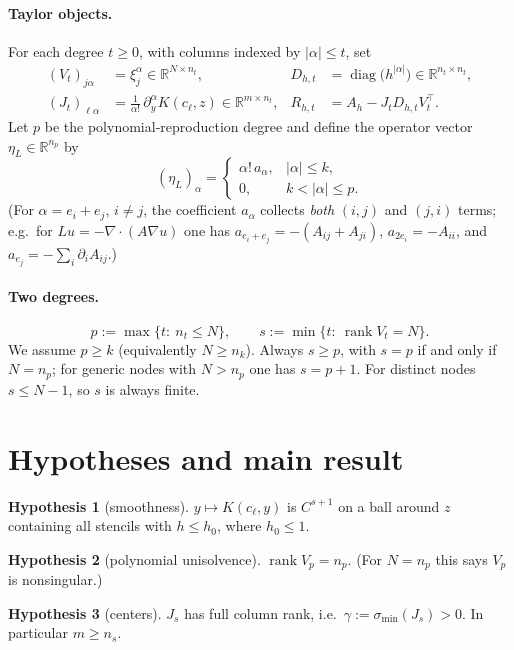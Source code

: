\documentclass[11pt]{article}
\newcommand{\R}{\mathbb{R}}
\newcommand{\smin}{\sigma_{\min}}
\newcommand{\rank}{\operatorname{rank}}
\newcommand{\diag}{\operatorname{diag}}
\theoremstyle{plain}
\theoremstyle{definition}
\newtheorem{hyp}{Hypothesis}
\theoremstyle{remark}
\begin{document}
\paragraph{Taylor objects.}
For each degree $t\ge0$, with columns indexed by $|\alpha|\le t$, set
\begin{align*}
(V_t)_{j\alpha}&=\xi_j^\alpha\in\R^{N\times n_t}, &
D_{h,t}&=\diag\big(h^{|\alpha|}\big)\in\R^{n_t\times n_t},\\
(J_t)_{\ell\alpha}&=\tfrac{1}{\alpha!}\,\partial_y^\alpha K(c_\ell,z)\in\R^{m\times n_t}, &
R_{h,t}&=A_h-J_tD_{h,t}V_t^{\top}.
\end{align*}
Let $p$ be the polynomial-reproduction degree and define the operator vector $\eta_L\in\R^{n_p}$ by
\[
(\eta_L)_\alpha=\begin{cases}\alpha!\,a_\alpha, & |\alpha|\le k,\\ 0,& k<|\alpha|\le p.\end{cases}
\]
(For $\alpha=e_i+e_j$, $i\ne j$, the coefficient $a_\alpha$ collects \emph{both} $(i,j)$ and $(j,i)$ terms; e.g.\ for $Lu=-\nabla\!\cdot(A\nabla u)$ one has $a_{e_i+e_j}=-(A_{ij}+A_{ji})$, $a_{2e_i}=-A_{ii}$, and $a_{e_j}=-\sum_i\partial_iA_{ij}$.)

\paragraph{Two degrees.}
\[
p:=\max\{t:\ n_t\le N\},\qquad s:=\min\{t:\ \rank V_t=N\}.
\]
We assume $p\ge k$ (equivalently $N\ge n_k$).
Always $s\ge p$, with $s=p$ if and only if $N=n_p$; for generic nodes with $N>n_p$ one has $s=p+1$.
For distinct nodes $s\le N-1$, so $s$ is always finite.

\section{Hypotheses and main result}

\begin{hyp}[smoothness]\label{h:smooth}
$y\mapsto K(c_\ell,y)$ is $C^{s+1}$ on a ball around $z$ containing all stencils with $h\le h_0$, where $h_0\le 1$.
\end{hyp}
\begin{hyp}[polynomial unisolvence]\label{h:poly}
$\rank V_p=n_p$.  (For $N=n_p$ this says $V_p$ is nonsingular.)
\end{hyp}
\begin{hyp}[centers]\label{h:centers}
$J_s$ has full column rank, i.e.\ $\gamma:=\smin(J_s)>0$. In particular $m\ge n_s$.
\end{hyp}
\end{document}
